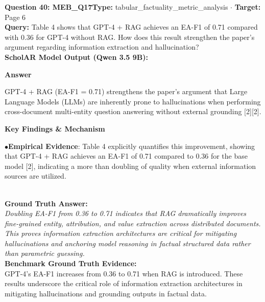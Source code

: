\documentclass[10pt,a4paper]{article}
\begin{document}
\begin{tcolorbox}[questionbox]
{\noindent\bfseries\large\color{navy} Question 40: MEB\_Q17}\hfill {\footnotesize\color{darkteal}\textbf{Type:} tabular\_factuality\_metric\_analysis $\cdot$ \textbf{Target:} Page 6}\\[4pt]
{\noindent\bfseries\color{accentblue} Query: } Table 4 shows that GPT-4 + RAG achieves an EA-F1 of 0.71 compared with 0.36 for GPT-4 without RAG. How does this result strengthen the paper's argument regarding information extraction and hallucination?\\[6pt]
{\noindent\bfseries\color{navy} ScholAR Model Output (Qwen 3.5 9B):}\\[2pt]
{\small \noindent \textbf{Answer}\par\vspace{3pt}GPT-4 + RAG (EA-F1 = 0.71)  strengthens the paper's argument that Large Language Models (LLMs) are inherently prone to hallucinations when performing cross-document multi-entity question answering without external grounding [2][2].\par\vspace{3pt}\noindent \textbf{Key Findings \& Mechanism}\par\vspace{3pt}\noindent\hspace*{8pt}$\bullet$\hspace*{4pt}\textbf{Empirical Evidence}: Table 4 explicitly quantifies this improvement, showing that GPT-4 + RAG achieves an EA-F1 of 0.71 compared to 0.36 for the base model [2], indicating a more than doubling of quality when external information sources are utilized.}\\[6pt]
{\noindent\bfseries\color{darkteal} Ground Truth Answer:}\\[2pt]
{\small\itshape Doubling EA-F1 from 0.36 to 0.71 indicates that RAG dramatically improves fine-grained entity, attribution, and value extraction across distributed documents. This proves information extraction architectures are critical for mitigating hallucinations and anchoring model reasoning in factual structured data rather than parametric guessing.}\\[4pt]
{\noindent\bfseries\color{darkteal} Benchmark Ground Truth Evidence:}\\[2pt]
{\footnotesize GPT-4's EA-F1 increases from 0.36 to 0.71 when RAG is introduced. These results underscore the critical role of information extraction architectures in mitigating hallucinations and grounding outputs in factual data.}\\[4pt]

\end{tcolorbox}
\end{document}
